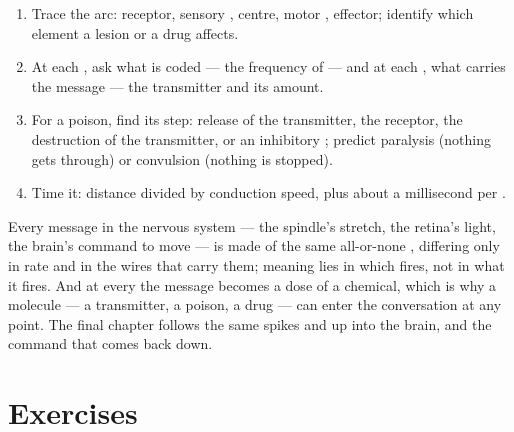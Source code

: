 \begin{method}\label{met:g12:stretch-reflex:analyse}
\begin{enumerate}
  \item Trace the arc: receptor, sensory , centre, motor ,
        effector; identify which element a lesion or a drug affects.
  \item At each , ask what is coded --- the frequency of  --- and at each , what carries the message
        --- the transmitter and its amount.
  \item For a poison, find its step: release of the transmitter, the
        receptor, the destruction of the transmitter, or an inhibitory
        ; predict paralysis (nothing gets through) or
        convulsion (nothing is stopped).
  \item Time it: distance divided by conduction speed, plus about a
        millisecond per .
\end{enumerate}
\end{method}

\begin{remark}\label{rem:g12:stretch-reflex:spikes}
Every message in the nervous system --- the spindle's stretch, the
retina's light, the brain's command to move --- is made of the same
all-or-none , differing only in rate and in the
wires that carry them; meaning lies in which  fires, not in what
it fires. And at every  the message becomes a dose of a
chemical, which is why a molecule --- a transmitter, a poison, a drug
--- can enter the conversation at any point. The final chapter follows
the same spikes and  up into the brain, and the command that
comes back down.
\end{remark}

\section{Exercises}


